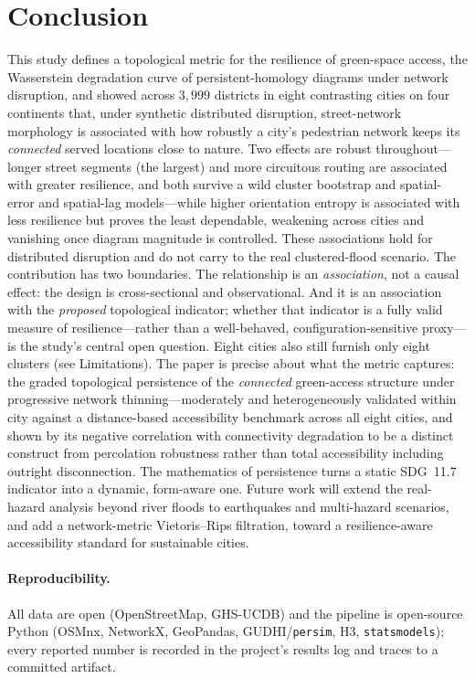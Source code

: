 \documentclass[sn-mathphys-num,pdflatex]{sn-jnl}
\begin{document}
\section{Conclusion}
This study defines a topological metric for the resilience of green-space access, the
Wasserstein degradation curve of persistent-homology diagrams under network
disruption, and showed across $3{,}999$ districts in eight contrasting cities on four
continents that, under synthetic distributed disruption, street-network morphology is
associated with how robustly a city's
pedestrian network keeps its \emph{connected} served locations close to nature. Two
effects are robust throughout---longer street segments (the largest) and more
circuitous routing are associated with greater resilience, and both survive a wild
cluster bootstrap and spatial-error and spatial-lag models---while higher orientation
entropy is associated with less resilience but proves the least dependable, weakening
across cities and vanishing once diagram magnitude is controlled. These associations
hold for distributed disruption and do not carry to the real clustered-flood scenario. The contribution has two boundaries. The relationship
is an \emph{association}, not a causal effect: the design is cross-sectional and
observational. And it is an association with the \emph{proposed} topological
indicator; whether that indicator is a fully valid measure of resilience---rather
than a well-behaved, configuration-sensitive proxy---is the study's central open
question. Eight cities also still furnish only eight clusters (see
Limitations). The paper is precise
about what the metric captures: the graded topological persistence of the
\emph{connected} green-access structure under progressive network thinning---moderately
and heterogeneously validated within city against a distance-based accessibility
benchmark across all eight cities, and shown by its negative correlation with
connectivity degradation to be a distinct construct from percolation robustness rather
than total accessibility including outright disconnection. The mathematics of persistence turns a
static SDG~11.7 indicator into a dynamic, form-aware one. Future work will
extend the real-hazard analysis beyond river floods to earthquakes and multi-hazard
scenarios, and add a network-metric Vietoris--Rips filtration, toward a
resilience-aware accessibility standard for
sustainable cities.

\paragraph{Reproducibility.} All data are open (OpenStreetMap, GHS-UCDB) and the
pipeline is open-source Python (OSMnx, NetworkX, GeoPandas, GUDHI/\texttt{persim},
H3, \texttt{statsmodels}); every reported number is recorded in the project's
results log and traces to a committed artifact.
\end{document}
